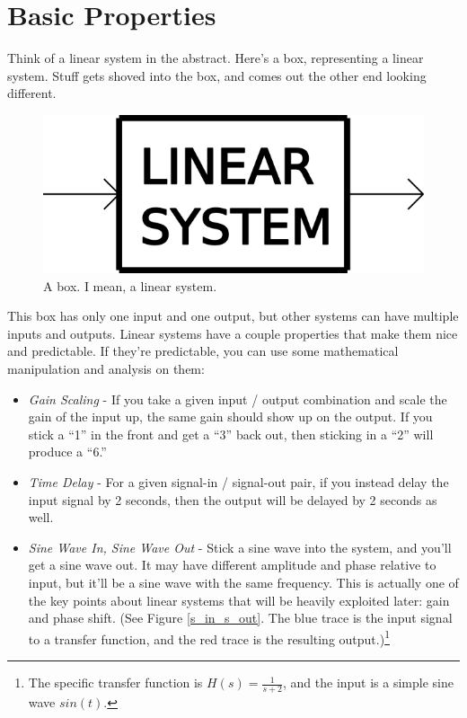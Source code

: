 \section{Basic Properties}

Think of a linear system in the abstract. Here's a box, representing a linear system. Stuff gets shoved into the box, and comes out the other end looking different.

\begin{figure}[h]
\centering
\includegraphics[scale=1.0]{linear_box.png}
\caption{A box. I mean, a linear system.}\label{abox}
\end{figure}

This box has only one input and one output, but other systems can have multiple inputs and outputs. Linear systems have a couple properties that make them nice and predictable. If they're predictable, you can use some mathematical manipulation and analysis on them:

\begin{itemize}
\item \emph{Gain Scaling} - If you take a given input / output combination and scale the gain of the input up, the same gain should show up on the output. If you stick a ``1'' in the front and get a ``3'' back out, then sticking in a ``2'' will produce a ``6.''
\item \emph{Time Delay} - For a given signal-in / signal-out pair, if you instead delay the input signal by 2 seconds, then the output will be delayed by 2 seconds as well.
\item \emph{Sine Wave In, Sine Wave Out} - Stick a sine wave into the system, and you'll get a sine wave out. It may have different amplitude and phase relative to input, but it'll be a sine wave with the same frequency. This is actually one of the key points about linear systems that will be heavily exploited later: gain and phase shift. (See Figure \ref{s_in_s_out}. The blue trace is the input signal to a transfer function, and the red trace is the resulting output.)\footnote{The specific transfer function is $H(s) = \frac{1}{s+2}$, and the input is a simple sine wave $sin(t)$.}

\end{itemize}

